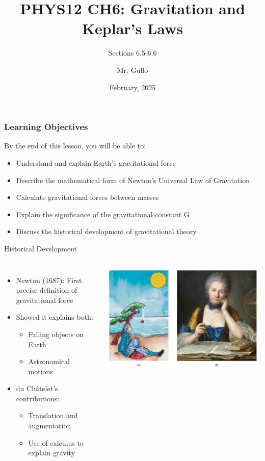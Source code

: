 \documentclass{beamer}
\title[Circular Motion]{PHYS12 CH6: Gravitation and Keplar's Laws}
\subtitle{Sections 6.5-6.6}
\author[Mr. Gullo]{Mr. Gullo}
\date[Feb 2025]{February, 2025}
\begin{document}
\frame{\titlepage}

\begin{frame}
\frametitle{Learning Objectives}
By the end of this lesson, you will be able to:
\begin{itemize}
  \item Understand and explain Earth's gravitational force
        \item Describe the mathematical form of Newton's Universal Law of Gravitation
        \item Calculate gravitational forces between masses
        \item Explain the significance of the gravitational constant G
        \item Discuss the historical development of gravitational theory
\end{itemize}
\end{frame}

\begin{frame}{Historical Development}
    \begin{columns}
        \begin{itemize}
            \item Newton (1687): First precise definition of gravitational force
            \item Showed it explains both:
                \begin{itemize}
                    \item Falling objects on Earth
                    \item Astronomical motions
                \end{itemize}
            \item du Châtelet's contributions:
                \begin{itemize}
                    \item Translation and augmentation
                    \item Use of calculus to explain gravity
                \end{itemize}
        \end{itemize}
        
        \includegraphics[width=\textwidth]{newtch.png}

        \end{columns}
\end{frame}
\end{document}
